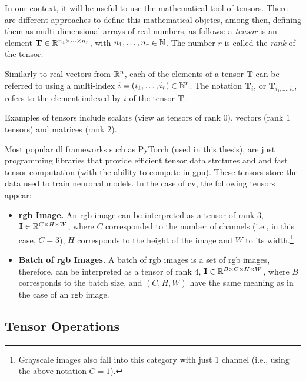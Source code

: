 In our context, it will be useful to use the mathematical tool of
tensors. There are different approaches to define this mathematical objetcs,
among then, defining them as multi-dimensional arrays of real numbers, as
follows: a \emph{tensor} is an element
\(\mathbf{T} \in \mathbb{R}^{n_1 \times \cdots \times n_r}\), with
\(n_1, \ldots, n_r \in \mathbb{N}\). The number \(r\) is called the \emph{rank} of the
tensor.

Similarly to real vectors from \(\mathbb{R}^n\), each of the elements of a tensor
\(\mathbf{T}\) can be referred to using a multi-index
\(i = (i_1, \ldots, i_r) \in \mathbb{N}^r\). The notation \(\mathbf{T}_i\), or
\(\mathbf{T}_{i_1, \ldots, i_r}\), refers to the element indexed by \(i\) of
the tensor \(\mathbf{T}\).

\begin{exampleBox}
  Examples of tensors include scalars (view as tensors of rank \(0\)), vectors
  (rank \(1\) tensors) and matrices (rank \(2\)).
\end{exampleBox}

Most popular \gls{dl} frameworks such as PyTorch (used in this thesis), are
just programming libraries that provide efficient tensor data strctures and and
fast tensor computation (with the ability to compute in \gls{gpu}). These
tensors store the data used to train neuronal models. In the case of \gls{cv},
the following tensors appear:
\begin{itemize}
  \item \textbf{\acs*{rgb} Image.} An \acs{rgb} image can be interpreted as a
  tensor of rank 3, \(\mathbf{I} \in \mathbb{R}^{C \times H \times W}\), where \(C\)
  corresponded to the number of channels (i.e., in this case, \(C = 3\)), \(H\)
  corresponds to the height of the image and \(W\) to its
  width.\footnote{Grayscale images also fall into this category with just 1
    channel (i.e., using the above notation \(C = 1\)).}
  \item \textbf{Batch of \acs*{rgb} Images.} A batch of \acs{rgb} images is a
  set of \acs{rgb} images, therefore, can be interpreted as a tensor of rank 4,
  \(\mathbf{I} \in \mathbb{R}^{B \times C \times H \times W}\), where \(B\) corresponds
  to the batch size, and \((C, H, W)\) have the same meaning as in the case of
  an \acs{rgb} image.
\end{itemize}


\subsection{Tensor Operations}

